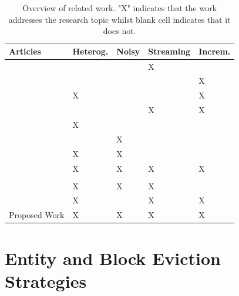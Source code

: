 \documentclass{ieeeaccess}
\begin{document}
\begin{table}[!t]
\centering
\caption{Overview of related work. "X" indicates that the work addresses the research topic whilst blank cell indicates that it does not.}
\label{tab:trabalhos}
\scriptsize
\setlength{\tabcolsep}{2pt}
\renewcommand{\arraystretch}{0.95}
\begin{tabularx}{\columnwidth}{>{\raggedright\arraybackslash}p{} >{\centering\arraybackslash}p{} >{\centering\arraybackslash}p{} >{\centering\arraybackslash}p{} >{\centering\arraybackslash}p{}}
\hline
\textbf{Articles} & \textbf{Heterog.} & \textbf{Noisy} & \textbf{Streaming} & \textbf{Increm.} \\
\hline \cite{DBLP:conf/edbt/KarapiperisGV18, karapiperis2023, Karapiperis2018SummarizationAF} &  &  & X &  \\
\hline \cite{DONASCIMENTO2018335, 10.14778/2732939.2732943,inproceedingssuperblocking} &  &  &  & X \\
\hline \cite{DBLP:conf/edbt/GazzarriH23, 8403302} & X &  &  & X \\
\hline \cite{10.1145/3448016.3457238, dev2022DeepLI} &  &  & X & X \\
\hline \cite{10.14778/2856318.2856326, 10.1145/3297280.3299730, Papadakis2016ScalingER} & X &  &  &  \\
\hline \cite{zeakis2023pretrainedembeddingsentityresolution, lshbased01} &  & X &  &  \\
\hline \cite{Li_2020} & X & X &  &  \\
\hline \cite{info13120568} & X & X & X & X \\
\hline \cite{kasai2019lrder} &  &  &  &  \\
\hline \cite{9378127} & X & X & X &  \\
\hline \cite{10.1109/TKDE.2024.3361022} & X &  & X & X \\
\hline Proposed Work & X & X & X & X \\
\hline
\end{tabularx}
\end{table}

\section{Entity and Block Eviction Strategies} \label{sec:estrategias-descarte-entidades}
\end{document}
